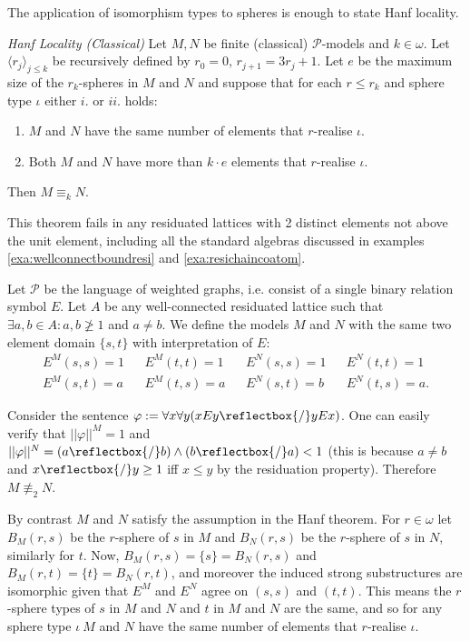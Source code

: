\documentclass{lmcs} %
\newcommand{\?}{\ensuremath{\mkern0.4\thinmuskip}}
\newcommand{\und}{\mathord{\reflectbox{/}}}%
\let\phi=\varphi
\newcommand{\CP}{\mathcal{P}}
\begin{document}
The application of isomorphism types to spheres is enough to state Hanf locality.
\begin{thmC} \emph{Hanf Locality (Classical)}
    Let $M,N$ be finite (classical) $\CP$-models and $k\in\omega$. Let $\langle r_j\rangle_{j\leq k}$ be recursively defined by $r_0=0$, $r_{j+1}=3r_j+1$. Let $e$ be the maximum size of the $r_k$-spheres in $M$ and $N$ and suppose that for each $r\leq r_k$ and sphere type $\iota$ either $i.$ or $ii.$ holds:\begin{enumerate}[label=\roman*.]
        \item $M$ and $N$ have the same number of elements that $r$-realise $\iota$.
        \item Both $M$ and $N$ have more than $k\cdot e$ elements that $r$-realise $\iota$. 
    \end{enumerate}
    Then $M\equiv_k N$.
\end{thmC}
\noindent
This theorem fails in any residuated lattices with 2 distinct elements not above the unit element, including all the standard algebras discussed in examples \ref{exa:wellconnectboundresi} and \ref{exa:resichaincoatom}.
\begin{exa}
    Let $\CP$ be the language of weighted graphs, i.e. consist of a single binary relation symbol $E$. Let $A$ be any well-connected residuated lattice such that $\exists a,b\in A:a,b\not\geq 1$ and $a\not=b$. We define the models $M$ and $N$ with the same two element domain $\{s,t\}$ with interpretation of $E$:\begin{align*}
        E^M(s,s)=1 && E^M(t,t)=1 && E^N(s,s)=1 && E^N(t,t)=1\\
        E^M(s,t)=a && E^M(t,s)=a && E^N(s,t)=b && E^N(t,s)=a.
    \end{align*}

    Consider the sentence $\phi:=\forall x\forall y(xEy\und yEx)$. One can easily verify that $||\phi||^M=1$ and $||\phi||^N=(a\und b)\land (b\und a)<1$ (this is because $a\not= b$ and $x\und y\geq 1$ iff $x\leq y$ by the residuation property). Therefore $M\not\equiv_2 N$. 

    By contrast $M$ and $N$ satisfy the assumption in the Hanf theorem. For $r\in\omega$ let $B_M(r,s)$ be the $r$-sphere of $s$ in $M$ and $B_N(r,s)$ be the $r$-sphere of $s$ in $N$, similarly for $t$. Now, $B_M(r,s)=\{s\}=B_N(r,s)$ and $B_M(r,t)=\{t\}=B_N(r,t)$, and moreover the induced strong substructures are isomorphic given that $E^M$ and $E^N$ agree on $(s,s)$ and $(t,t)$. This means the $r$-sphere types of $s$ in $M$ and $N$ and $t$ in $M$ and $N$ are the same, and so for any sphere type $\iota\ M$ and $N$ have the same number of elements that $r$-realise $\iota$.
\end{exa}
\end{document}
